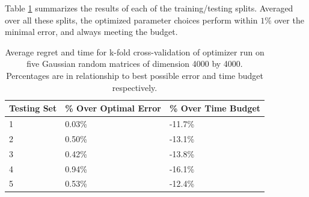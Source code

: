 Table \ref{fig:4kCrossTable} summarizes the results of each of the 
training/testing splits. Averaged over all these splits, the optimized 
parameter choices perform within $1\%$ over the minimal error, 
and always meeting the budget.

\begin{table}
\label{fig:4kCrossTable}
\begin{center}
    \begin{tabular}{| p{2.2cm} | p{2.2cm} | p{2.2cm} |}
    \hline
    Testing Set & \% Over Optimal Error & \% Over Time Budget \\ \hline
    1 & 0.03\% & -11.7\% \\ \hline
    2 & 0.50\% & -13.1\% \\ \hline
    3 & 0.42\% & -13.8\% \\ \hline
    4 & 0.94\% & -16.1\% \\ \hline
    5 & 0.53\% & -12.4\% \\ \hline
    \end{tabular}
\end{center}
\caption{Average regret and time for k-fold cross-validation of optimizer run on five Gaussian random matrices of dimension 4000 by 4000. Percentages are in relationship to best possible error and time budget respectively.}
\end{table}

